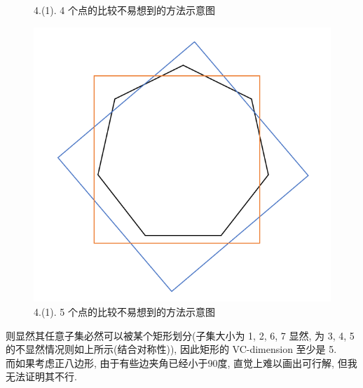 \documentclass[UTF8]{article}
\begin{document}
\begin{center}
\begin{minipage}{\linewidth/4}
\begin{figure}[H]
	\caption{4.(1). 4 个点的比较不易想到的方法示意图}
\end{figure}
\end{minipage}
\begin{minipage}{\linewidth/4}
\begin{figure}[H]
	\centering
	\includegraphics[width=\linewidth]{image/4.1.5.png}
	\caption{4.(1). 5 个点的比较不易想到的方法示意图}
\end{figure}
\end{minipage}
\end{center}
则显然其任意子集必然可以被某个矩形划分(子集大小为 1, 2, 6, 7 显然, 为 3, 4, 5 的不显然情况则如上所示(结合对称性)), 因此矩形的 VC-dimension 至少是 5. \\
而如果考虑正八边形, 由于有些边夹角已经小于90度, 直觉上难以画出可行解, 但我无法证明其不行.
\end{document}
